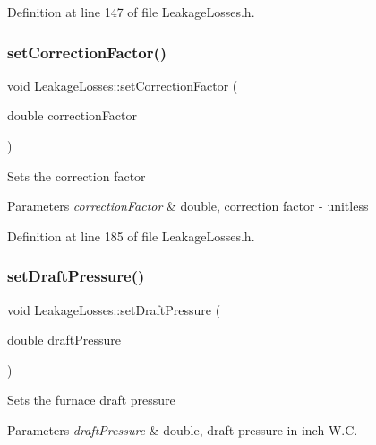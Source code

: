 Definition at line 147 of file Leakage\+Losses.\+h.

\mbox{\label{class_leakage_losses_a1af53750d5d9573dffa8674b3479e8d6}} 
\subsubsection{\texorpdfstring{set\+Correction\+Factor()}{setCorrectionFactor()}}
{\footnotesize\ttfamily void Leakage\+Losses\+::set\+Correction\+Factor (\begin{DoxyParamCaption}\item[{double}]{correction\+Factor }\end{DoxyParamCaption})\hspace{0.3cm}{\ttfamily [inline]}}

Sets the correction factor


\begin{DoxyParams}{Parameters}
{\em correction\+Factor} & double, correction factor -\/ unitless \\
\hline
\end{DoxyParams}


Definition at line 185 of file Leakage\+Losses.\+h.

\mbox{\label{class_leakage_losses_a33f31dc336fc6af0fd1e8c8739f37b1a}} 
\subsubsection{\texorpdfstring{set\+Draft\+Pressure()}{setDraftPressure()}}
{\footnotesize\ttfamily void Leakage\+Losses\+::set\+Draft\+Pressure (\begin{DoxyParamCaption}\item[{double}]{draft\+Pressure }\end{DoxyParamCaption})\hspace{0.3cm}{\ttfamily [inline]}}

Sets the furnace draft pressure


\begin{DoxyParams}{Parameters}
{\em draft\+Pressure} & double, draft pressure in inch W.\+C. \\
\hline
\end{DoxyParams}


